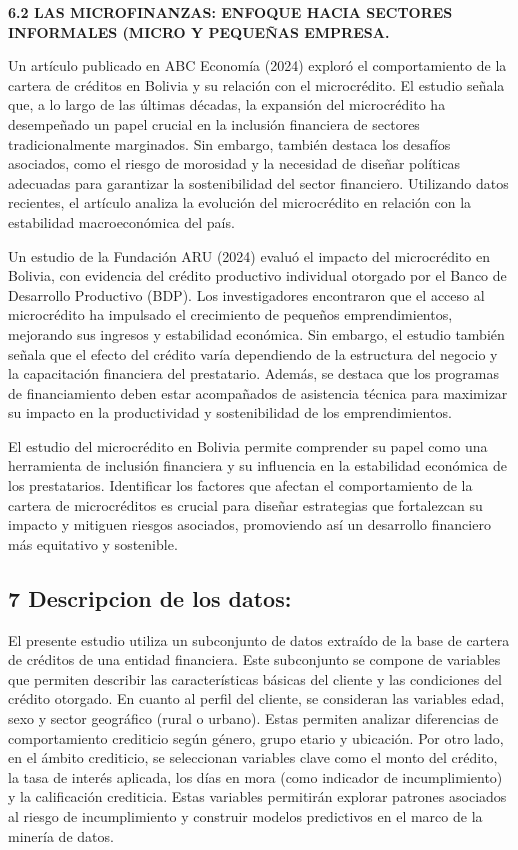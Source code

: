 \documentclass[Royal,times,sageh]{sagej}
\begin{document}
\textbf{6.2 LAS MICROFINANZAS: ENFOQUE HACIA SECTORES INFORMALES (MICRO
Y PEQUEÑAS EMPRESA.}

Un artículo publicado en ABC Economía (2024) exploró el comportamiento
de la cartera de créditos en Bolivia y su relación con el microcrédito.
El estudio señala que, a lo largo de las últimas décadas, la expansión
del microcrédito ha desempeñado un papel crucial en la inclusión
financiera de sectores tradicionalmente marginados. Sin embargo, también
destaca los desafíos asociados, como el riesgo de morosidad y la
necesidad de diseñar políticas adecuadas para garantizar la
sostenibilidad del sector financiero. Utilizando datos recientes, el
artículo analiza la evolución del microcrédito en relación con la
estabilidad macroeconómica del país.

Un estudio de la Fundación ARU (2024) evaluó el impacto del microcrédito
en Bolivia, con evidencia del crédito productivo individual otorgado por
el Banco de Desarrollo Productivo (BDP). Los investigadores encontraron
que el acceso al microcrédito ha impulsado el crecimiento de pequeños
emprendimientos, mejorando sus ingresos y estabilidad económica. Sin
embargo, el estudio también señala que el efecto del crédito varía
dependiendo de la estructura del negocio y la capacitación financiera
del prestatario. Además, se destaca que los programas de financiamiento
deben estar acompañados de asistencia técnica para maximizar su impacto
en la productividad y sostenibilidad de los emprendimientos.

El estudio del microcrédito en Bolivia permite comprender su papel como
una herramienta de inclusión financiera y su influencia en la
estabilidad económica de los prestatarios. Identificar los factores que
afectan el comportamiento de la cartera de microcréditos es crucial para
diseñar estrategias que fortalezcan su impacto y mitiguen riesgos
asociados, promoviendo así un desarrollo financiero más equitativo y
sostenible.

\subsection{\texorpdfstring{7 \textbf{Descripcion de los
datos:}}{7 Descripcion de los datos:}}\label{descripcion-de-los-datos}

El presente estudio utiliza un subconjunto de datos extraído de la base
de cartera de créditos de una entidad financiera. Este subconjunto se
compone de variables que permiten describir las características básicas
del cliente y las condiciones del crédito otorgado. En cuanto al perfil
del cliente, se consideran las variables edad, sexo y sector geográfico
(rural o urbano). Estas permiten analizar diferencias de comportamiento
crediticio según género, grupo etario y ubicación. Por otro lado, en el
ámbito crediticio, se seleccionan variables clave como el monto del
crédito, la tasa de interés aplicada, los días en mora (como indicador
de incumplimiento) y la calificación crediticia. Estas variables
permitirán explorar patrones asociados al riesgo de incumplimiento y
construir modelos predictivos en el marco de la minería de datos.
\end{document}
